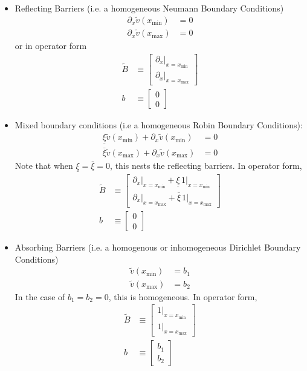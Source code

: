 \documentclass[11pt]{article}
\newcommand{\D}[1][]{\ensuremath{\partial_{#1}}}
\theoremstyle{definition}
\begin{document}
\begin{itemize}
	\item Reflecting Barriers (i.e. a homogeneous Neumann Boundary Conditions)
	\begin{align}
		\D[x]\tilde{v}({x_{\min}} ) &= 0\label{eq:reflecting-BC1}\\
		\D[x]\tilde{v}({x_{\max}}) &= 0\label{eq:reflecting-BC2}
	\end{align}
	or in operator form
	\begin{align}
		\tilde{B} &\equiv \begin{bmatrix}
		\partial_x\vert_{x = x_{\min}}\\
		\partial_x\vert_{x = x_{\max}}
		\end{bmatrix}\\
		b &\equiv \begin{bmatrix} 0\\ 0 \end{bmatrix}
	\end{align}
	\item Mixed boundary conditions (i.e a homogeneous Robin Boundary Conditions):
	\begin{align}
	\underline{\xi} \tilde{v}({x_{\min}}) + \D[x]\tilde{v}({x_{\min}} ) &= 0\label{eq:mixed-BC1}\\
	\overline{\xi} \tilde{v}({x_{\max}}) + \D[x]\tilde{v}({x_{\max}}) &= 0\label{eq:mixed-BC2}
	\end{align}
	Note that when $\underline{\xi} = \overline{\xi} = 0$, this nests the reflecting barriers.  In operator form,
	\begin{align}
		\tilde{B} &\equiv \begin{bmatrix}
		\partial_x\vert_{x = x_{\min}} + \underline{\xi}\,1 \vert_{x = x_{\min}}\\
		\partial_x\vert_{x = x_{\max}} + \bar{\xi}\,1 \vert_{x = x_{\max}}
		\end{bmatrix}\\
		b &\equiv \begin{bmatrix} 0\\ 0 \end{bmatrix}
	\end{align}
	\item Absorbing Barriers (i.e. a homogenous or inhomogeneous Dirichlet Boundary Conditions)
	\begin{align}
		\tilde{v}({x_{\min}} ) &= b_1\label{eq:absorbing-BC1}\\
		\tilde{v}({x_{\max}}) &= b_2\label{eq:absorbing-BC2}
	\end{align}
	In the case of $b_1 = b_2 = 0$, this is homogeneous. In operator form,
	\begin{align}
		\tilde{B} &\equiv \begin{bmatrix}
		1 \vert_{x = x_{\min}}\\
		1 \vert_{x = x_{\max}}
		\end{bmatrix}\\
		b &\equiv \begin{bmatrix} b_1\\ b_2 \end{bmatrix}
	\end{align}
\end{itemize}
\end{document}
